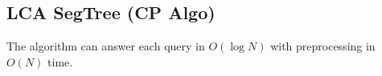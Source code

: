 \subsection{LCA SegTree (CP Algo)}

The algorithm can answer each query in $O(\log N)$ with preprocessing in $O(N)$ time.
